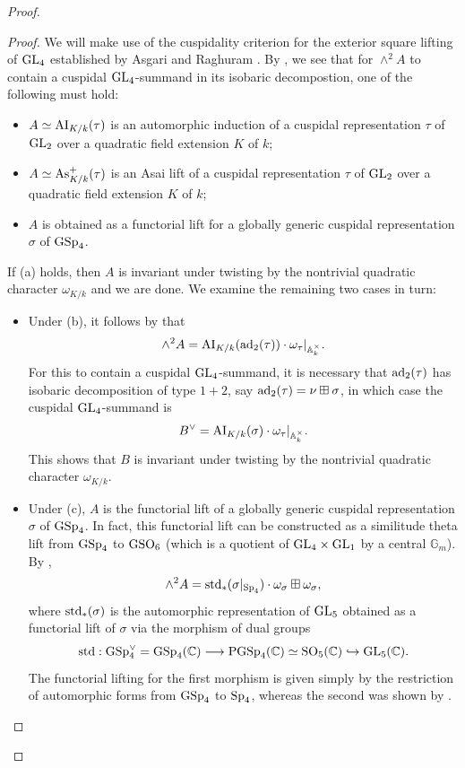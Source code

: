 \documentclass[11pt]{amsart}
\theoremstyle{plain}
\numberwithin{equation}{section}
\newcommand{\C}{\mathbb C}
\newcommand{\A}{\mathbb A}
\def\GSp{{\rm GSp}}
\def\PGSp{{\rm PGSp}}
\def\Sp{{\rm Sp}}
\def\GL{{\rm GL}}
\def\GSO{{\rm GSO}}
\def\SO{{\rm SO}}
\def\Sp{{\rm Sp}}
\def\A{{\mathbb A}}
\def\C{{\bf C}}
\def\C{{\mathbb C}}
\begin{document}
\begin{proof}
\begin{proof}
We will make use of the cuspidality criterion for the exterior square lifting of $\GL_4$ established by Asgari  and Raghuram \cite{AR}.  By \cite[Prop. 3.1, Prop. 3.2, Prop. 3.3 and Prop. 3.5]{AR}, we see that for $\wedge^2 A$ to contain a cuspidal $\GL_4$-summand in its isobaric decompostion, 
one of the following must hold:
 \vskip 5pt
 
 \begin{itemize}
 \item[(a)]  $A \simeq {\rm AI}_{K/k}(\tau)$ is an automorphic induction of a cuspidal representation $\tau$ of $\GL_2$ over a quadratic field extension $K$ of $k$;
 \item[(b)] $A \simeq  {\rm As}_{K/k}^+(\tau)$ is an Asai lift of a cuspidal representation $\tau$ of $\GL_2$ over a quadratic field extension $K$ of $k$;
 \item[(c)] $A$ is obtained as a functorial lift for a globally generic cuspidal representation $\sigma$ of $\GSp_4$. 
  \end{itemize}
 
If (a) holds, then $A$ is invariant under twisting by the nontrivial quadratic character $\omega_{K/k}$ and we are done.
We examine the remaining two cases in turn:
\vskip 5pt

\begin{itemize}
\item[(b)] Under (b), it follows by \cite[Proof of Prop. 3.2]{AR} that
\[  \wedge^2 A = {\rm AI}_{K/k}( {\rm ad}_2(\tau)) \cdot \omega_{\tau}|_{\A_k^{\times}}. \]
For this to contain a cuspidal $\GL_4$-summand, it is necessary that ${\rm ad}_2(\tau)$ has isobaric decomposition of type $1+2$, say ${\rm ad}_2(\tau) = \nu \boxplus \sigma$, in which case the cuspidal $\GL_4$-summand is 
\[  B^{\vee} = {\rm AI}_{K/k}(\sigma) \cdot \omega_{\tau}|_{\A_k^{\times}}. \]
This shows that $B$ is invariant under twisting by the nontrivial quadratic character $\omega_{K/k}$.
\vskip 5pt

\item[(c)] Under (c),  $A$ is the functorial  lift of a globally generic cuspidal representation $\sigma$ of $\GSp_4$.  
In fact, this functorial lift can be constructed as a similitude theta lift from $\GSp_4$ to $\GSO_6$ (which is a quotient of  $\GL_4 \times \GL_1$ by a central $\mathbb{G}_m$). 
  By \cite[Prop. 3.3]{AR}, 
\[ \wedge^2 A =  {\rm std}_*(\sigma|_{\Sp_4})\cdot \omega_{\sigma}   \boxplus \omega_{\sigma}, \]
where ${\rm std}_*(\sigma)$ is the automorphic representation of $\GL_5$ obtained as a functorial lift of $\sigma$ via the morphism of dual groups
\[ {\rm std}:  \GSp_4^{\vee} = \GSp_4(\C) \longrightarrow \PGSp_4(\C) \simeq \SO_5(\C) \hookrightarrow \GL_5(\C). \]
The functorial lifting  for the first morphism is given simply by the restriction of automorphic forms from $\GSp_4$ to $\Sp_4$, whereas the second was shown by \cite{CKPSS, A}. 
\vskip 5pt


\end{itemize}
\end{proof}
\end{proof}
\end{document}
